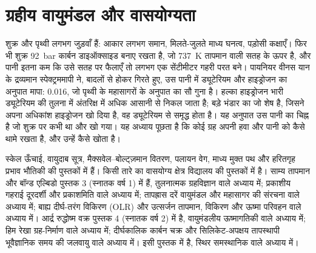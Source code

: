 \chapter{ग्रहीय वायुमंडल और वासयोग्यता}\label{ch:b3:planetary-atmospheres}

शुक्र और पृथ्वी लगभग जुड़वाँ हैं: आकार लगभग समान, मिलते-जुलते माध्य
घनत्व, पड़ोसी कक्षाएँ। फिर भी शुक्र \qty{92}{bar} कार्बन डाइऑक्साइड बनाए रखता है,
जो \qty{737}{K} तापमान वाली सतह के ऊपर है, और पानी इतना कम कि
उसे सतह पर फैलाएँ तो लगभग एक सेंटीमीटर गहरी परत बने। पायनियर वीनस यान के
द्रव्यमान स्पेक्ट्रममापी ने, बादलों से होकर गिरते हुए, उस पानी में
ड्यूटेरियम और हाइड्रोजन का अनुपात मापा: \num{0.016},
जो पृथ्वी के महासागरों के अनुपात का सौ गुना है। हल्का हाइड्रोजन
भारी ड्यूटेरियम की तुलना में अंतरिक्ष में अधिक आसानी से निकल जाता है; बड़े भंडार का जो शेष है,
जिसने अपना अधिकांश हाइड्रोजन खो दिया है, वह ड्यूटेरियम से समृद्ध होता है। यह अनुपात उस पानी का चिह्न है
जो शुक्र पर कभी था और खो गया। यह अध्याय पूछता है कि कोई ग्रह
अपनी हवा और पानी को कैसे थामे रखता है, और उन्हें कैसे खोता है।

\begin{recall}
स्केल ऊँचाई, वायुदाब सूत्र, मैक्सवेल--बोल्ट्ज़मान
वितरण, पलायन वेग, माध्य मुक्त पथ और हरितगृह
प्रभाव भौतिकी की पुस्तकों में हैं। किसी तारे का वासयोग्य क्षेत्र
विद्यालय की पुस्तकों में है। साम्य तापमान और बॉन्ड एल्बिडो
पुस्तक 3 (स्नातक वर्ष 1) में हैं, तुलनात्मक ग्रहविज्ञान वाले अध्याय में; प्रकाशीय गहराई
दूरदर्शी और प्रकाशमिति वाले अध्याय में; तापह्रास दरें वायुमंडल
और महासागर की संरचना वाले अध्याय में; बाह्य दीर्घ-तरंग विकिरण
(OLR) और उत्सर्जन तापमान, विकिरण और ऊष्मा परिवहन वाले अध्याय में।
आर्द्र रुद्धोष्म वक्र पुस्तक 4 (स्नातक वर्ष 2) में है,
वायुमंडलीय ऊष्मागतिकी वाले अध्याय में; हिम रेखा ग्रह-निर्माण वाले
अध्याय में; दीर्घकालिक कार्बन चक्र और सिलिकेट-अपक्षय तापस्थापी
भूवैज्ञानिक समय की जलवायु वाले अध्याय में।  इसी पुस्तक में है,
स्थिर
समस्थानिक वाले अध्याय में।
\end{recall}

